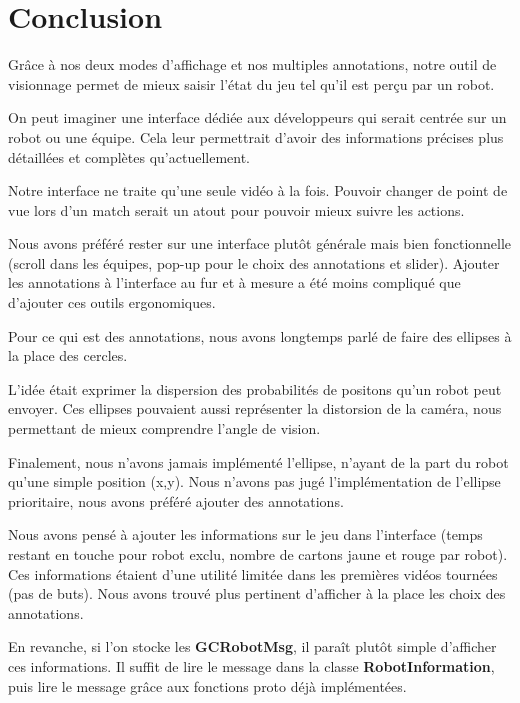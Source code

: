 \chapter{Conclusion}

Grâce à nos deux modes d'affichage et nos multiples annotations, 
notre outil de visionnage permet de mieux saisir l'état du jeu tel
qu'il est perçu par un robot.
\bigskip

On peut imaginer une interface dédiée aux développeurs qui serait
centrée sur un robot ou une équipe. Cela leur permettrait d'avoir 
des informations précises plus détaillées et complètes 
qu'actuellement.
\bigskip

Notre interface ne traite qu'une seule vidéo à la fois. Pouvoir 
changer de point de vue lors d'un match serait un atout pour 
pouvoir mieux suivre les actions.
\bigskip

Nous avons préféré rester sur une interface plutôt générale mais 
bien fonctionnelle (scroll dans les équipes, pop-up pour le choix 
des annotations et slider). Ajouter les annotations à l'interface 
au fur et à mesure a été moins compliqué que d'ajouter ces outils 
ergonomiques.
\bigskip

Pour ce qui est des annotations, nous avons longtemps parlé de 
faire des ellipses à la place des cercles. 
\bigskip

L'idée était exprimer la dispersion des probabilités de positons 
qu'un robot peut envoyer. Ces ellipses pouvaient aussi représenter
la distorsion de la caméra, nous permettant de mieux comprendre 
l'angle de vision.
\bigskip

Finalement, nous n'avons jamais implémenté l'ellipse, n'ayant de 
la part du robot qu'une simple position (x,y). Nous n'avons pas 
jugé l'implémentation de l'ellipse prioritaire, nous avons préféré
ajouter des annotations.
\bigskip
\newpage

Nous avons pensé à ajouter les informations sur le jeu dans
l'interface (temps restant en touche pour robot exclu, nombre de 
cartons jaune et rouge par robot). Ces informations étaient d'une 
utilité limitée dans les premières vidéos tournées (pas de buts). 
Nous avons trouvé plus pertinent d'afficher à la place les choix 
des annotations.
\bigskip

En revanche, si l'on stocke les \textbf{GCRobotMsg}, il paraît 
plutôt simple d'afficher ces informations. Il suffit de lire le 
message dans la classe \textbf{RobotInformation}, puis lire le 
message grâce aux fonctions proto déjà implémentées.
\bigskip

